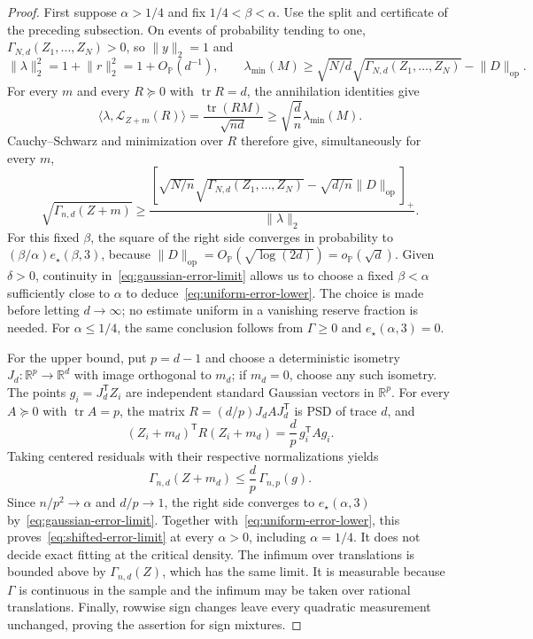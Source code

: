 \documentclass[11pt]{article}
\newcommand{\R}{\mathbb R}
\newcommand{\Pbb}{\mathbb P}
\DeclareMathOperator{\tr}{tr}
\newcommand{\opnorm}[1]{\lVert#1\rVert_{\mathrm{op}}}
\newcommand{\norm}[1]{\lVert#1\rVert}
\newcommand{\OP}{O_{\Pbb}}
\newcommand{\oP}{o_{\Pbb}}
\theoremstyle{remark}
\begin{document}
\begin{proof}
First suppose $\alpha>1/4$ and fix $1/4<\beta<\alpha$. Use the split
and certificate of the preceding subsection. On events of probability
tending to one, $\Gamma_{N,d}(Z_1,\ldots,Z_N)>0$, so $\norm y_2=1$ and
\[
 \norm\lambda_2^2=1+\norm r_2^2=1+\OP(d^{-1}),\qquad
 \lambda_{\min}(M)\ge
    \sqrt{N/d}\sqrt{\Gamma_{N,d}(Z_1,\ldots,Z_N)}-\opnorm D.
\]
For every $m$ and every $R\succeq0$ with $\tr R=d$, the annihilation
identities give
\[
 \langle\lambda,\mathcal L_{Z+m}(R)\rangle
   =\frac{\tr(RM)}{\sqrt{nd}}
   \ge\sqrt{\frac dn}\lambda_{\min}(M).
\]
Cauchy--Schwarz and minimization over $R$ therefore give, simultaneously
for every $m$,
\begin{equation}\label{eq:sharp-uniform-error-bound}
 \sqrt{\Gamma_{n,d}(Z+m)}\ge
 \frac{\left[
    \sqrt{N/n}\sqrt{\Gamma_{N,d}(Z_1,\ldots,Z_N)}
       -\sqrt{d/n}\opnorm D\right]_+}{\norm\lambda_2}.
\end{equation}
For this fixed $\beta$, the square of the right side converges in
probability to $(\beta/\alpha)e_\star(\beta,3)$, because
$\opnorm D=\OP(\sqrt{\log(2d)})=\oP(\sqrt d)$.
Given $\delta>0$, continuity in~\eqref{eq:gaussian-error-limit} allows
us to choose a fixed $\beta<\alpha$ sufficiently close to $\alpha$ to
deduce~\eqref{eq:uniform-error-lower}. The choice is made before
letting $d\to\infty$; no estimate uniform in a vanishing reserve
fraction is needed. For $\alpha\le1/4$, the same conclusion follows
from $\Gamma\ge0$ and $e_\star(\alpha,3)=0$.

For the upper bound, put $p=d-1$ and choose a deterministic isometry
$J_d:\R^p\to\R^d$ with image orthogonal to $m_d$; if $m_d=0$, choose
any such isometry. The points $g_i=J_d^{\mathsf T}Z_i$ are independent
standard Gaussian vectors in $\R^p$. For every $A\succeq0$ with
$\tr A=p$, the matrix $R=(d/p)J_dAJ_d^{\mathsf T}$ is PSD of trace $d$,
and
\[
 (Z_i+m_d)^{\mathsf T}R(Z_i+m_d)=\frac dp\,g_i^{\mathsf T}Ag_i.
\]
Taking centered residuals with their respective normalizations yields
\begin{equation}\label{eq:projection-error-upper}
 \Gamma_{n,d}(Z+m_d)\le\frac dp\,\Gamma_{n,p}(g).
\end{equation}
Since $n/p^2\to\alpha$ and $d/p\to1$, the right side converges to
$e_\star(\alpha,3)$ by~\eqref{eq:gaussian-error-limit}.
Together with~\eqref{eq:uniform-error-lower}, this
proves~\eqref{eq:shifted-error-limit} at every $\alpha>0$, including
$\alpha=1/4$. It does not decide exact fitting at the critical density.
The infimum over translations is bounded above by $\Gamma_{n,d}(Z)$,
which has the same limit. It is measurable because $\Gamma$ is
continuous in the sample and the infimum may be taken over rational
translations. Finally, rowwise sign changes leave every quadratic
measurement unchanged, proving the assertion for sign mixtures.
\end{proof}
\end{document}
